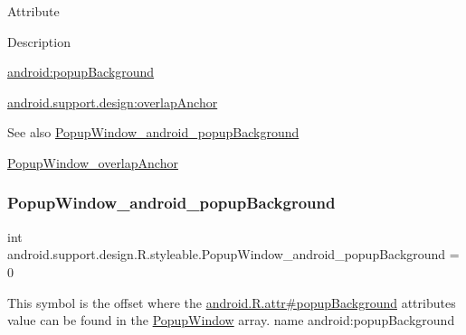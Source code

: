 Attribute

Description 

{\ttfamily \hyperlink{classandroid_1_1support_1_1design_1_1R_1_1styleable_a2fedd1345d1bfecdd5696f73dc36cff0}{android\+:popup\+Background}}

{\ttfamily \hyperlink{classandroid_1_1support_1_1design_1_1R_1_1styleable_ae356d65ede3716075d4f6eea0ab17081}{android.\+support.\+design\+:overlap\+Anchor}}

\begin{DoxySeeAlso}{See also}
\hyperlink{classandroid_1_1support_1_1design_1_1R_1_1styleable_a2fedd1345d1bfecdd5696f73dc36cff0}{Popup\+Window\+\_\+android\+\_\+popup\+Background} 

\hyperlink{classandroid_1_1support_1_1design_1_1R_1_1styleable_ae356d65ede3716075d4f6eea0ab17081}{Popup\+Window\+\_\+overlap\+Anchor} 
\end{DoxySeeAlso}
\mbox{\label{classandroid_1_1support_1_1design_1_1R_1_1styleable_a2fedd1345d1bfecdd5696f73dc36cff0}} 
\subsubsection{\texorpdfstring{Popup\+Window\+\_\+android\+\_\+popup\+Background}{PopupWindow\_android\_popupBackground}}
{\footnotesize\ttfamily int android.\+support.\+design.\+R.\+styleable.\+Popup\+Window\+\_\+android\+\_\+popup\+Background = 0\hspace{0.3cm}{\ttfamily [static]}}

This symbol is the offset where the \hyperlink{}{android.\+R.\+attr\#popup\+Background} attribute\textquotesingle{}s value can be found in the \hyperlink{classandroid_1_1support_1_1design_1_1R_1_1styleable_aa75bc963c35e5bb705cefe081e851f59}{Popup\+Window} array.  name android\+:popup\+Background \mbox{\label{classandroid_1_1support_1_1design_1_1R_1_1styleable_ae356d65ede3716075d4f6eea0ab17081}} 
